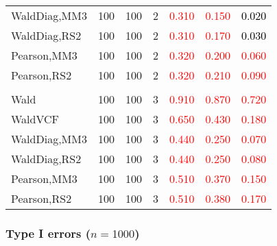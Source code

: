 \documentclass[
]{article}
\begin{document}
\begin{table}[H]
{\begin{tabular}[t]{lrrrrrr}
\hspace{1em}WaldDiag,MM3 & 100 & 100 & 2 & \textcolor{red}{0.310} & \textcolor{red}{0.150} & \textcolor{black}{0.020}\\
\hspace{1em}WaldDiag,RS2 & 100 & 100 & 2 & \textcolor{red}{0.310} & \textcolor{red}{0.170} & \textcolor{black}{0.030}\\
\hspace{1em}Pearson,MM3 & 100 & 100 & 2 & \textcolor{red}{0.320} & \textcolor{red}{0.200} & \textcolor{red}{0.060}\\
\hspace{1em}Pearson,RS2 & 100 & 100 & 2 & \textcolor{red}{0.320} & \textcolor{red}{0.210} & \textcolor{red}{0.090}\\
\addlinespace[0.3em]
\multicolumn{7}{l}{\textbf{3F 15V}}\\
\hspace{1em}Wald & 100 & 100 & 3 & \textcolor{red}{0.910} & \textcolor{red}{0.870} & \textcolor{red}{0.720}\\
\hspace{1em}WaldVCF & 100 & 100 & 3 & \textcolor{red}{0.650} & \textcolor{red}{0.430} & \textcolor{red}{0.180}\\
\hspace{1em}WaldDiag,MM3 & 100 & 100 & 3 & \textcolor{red}{0.440} & \textcolor{red}{0.250} & \textcolor{red}{0.070}\\
\hspace{1em}WaldDiag,RS2 & 100 & 100 & 3 & \textcolor{red}{0.440} & \textcolor{red}{0.250} & \textcolor{red}{0.080}\\
\hspace{1em}Pearson,MM3 & 100 & 100 & 3 & \textcolor{red}{0.510} & \textcolor{red}{0.370} & \textcolor{red}{0.150}\\
\hspace{1em}Pearson,RS2 & 100 & 100 & 3 & \textcolor{red}{0.510} & \textcolor{red}{0.380} & \textcolor{red}{0.170}\\
\bottomrule
\end{tabular}}
\endgroup{}
\end{table}

\hypertarget{type-i-errors-n1000-3}{%
\subsubsection{\texorpdfstring{Type I errors
(\(n=1000\))}{Type I errors (n=1000)}}\label{type-i-errors-n1000-3}}
\end{document}
